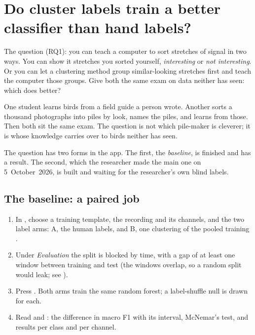\section{Do cluster labels train a better classifier than hand labels?}\label{sec:workflows-rq1}
The question (RQ1): you can teach a computer to sort stretches of signal in two ways. You can
show it stretches you sorted yourself, \emph{interesting} or \emph{not interesting}. Or you can
let a clustering method group similar-looking stretches first and teach the computer those
groups. Give both the same exam on data neither has seen: which does better?

\begin{plainterms}
One student learns birds from a field guide a person wrote. Another sorts a thousand
photographs into piles by look, names the piles, and learns from those. Then both sit the same
exam. The question is not which pile-maker is cleverer; it is whose knowledge carries over to
birds neither has seen.
\end{plainterms}

The question has two forms in the app. The first, the \emph{baseline}, is finished and has a
result. The second, which the researcher made the main one on 5~October~2026, is built and
waiting for the researcher's own blind labels.

\subsection*{The baseline: a paired job}
\begin{enumerate}
\item In , choose a training template, the recording and its channels,
  and the two label arms: A, the human labels, and B, one clustering of the pooled training
  .
\item Under \emph{Evaluation} the split is blocked by time, with a gap of at least one window
  between training and test (the windows overlap, so a random split would leak; see
  ).
\item Press . Both arms train the same random forest; a label-shuffle null
  is drawn for each.
\item Read  and : the difference in macro F1
  with its interval, McNemar's test, and results per class and per channel.
\end{enumerate}

